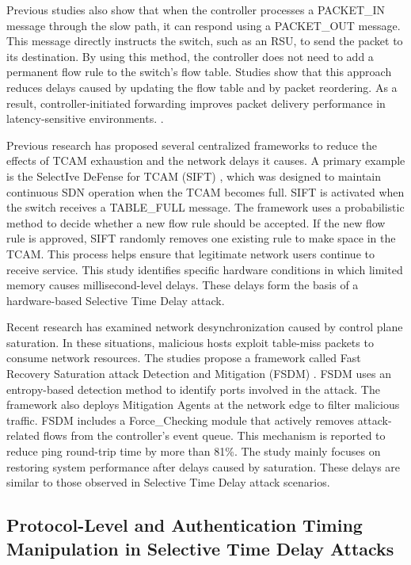 \documentclass[12pt, a4paper]{report}
\begin{document}
Previous studies also show that when the controller processes a PACKET\_IN message through the slow path, it can respond using a PACKET\_OUT message. This message directly instructs the switch, such as an RSU, to send the packet to its destination. By using this method, the controller does not need to add a permanent flow rule to the switch's flow table. Studies show that this approach reduces delays caused by updating the flow table and by packet reordering. As a result, controller-initiated forwarding improves packet delivery performance in latency-sensitive environments. \cite{PASCOAL2020107223} \cite{7929710}.

Previous research has proposed several centralized frameworks to reduce the effects of TCAM exhaustion and the network delays it causes. A primary example is the SelectIve DeFense for TCAM (SIFT) \cite{pascoal2017slow}, which was designed to maintain continuous SDN operation when the TCAM becomes full. SIFT is activated when the switch receives a TABLE\_FULL message. The framework uses a probabilistic method to decide whether a new flow rule should be accepted. If the new flow rule is approved, SIFT randomly removes one existing rule to make space in the TCAM. This process helps ensure that legitimate network users continue to receive service. This study identifies specific hardware conditions in which limited memory causes millisecond-level delays. These delays form the basis of a hardware-based Selective Time Delay attack.

Recent research has examined network desynchronization caused by control plane saturation. In these situations, malicious hosts exploit table-miss packets to consume network resources. The studies propose a framework called Fast Recovery Saturation attack Detection and Mitigation (FSDM) \cite{9356082}. FSDM uses an entropy-based detection method to identify ports involved in the attack. The framework also deploys Mitigation Agents at the network edge to filter malicious traffic. FSDM includes a Force\_Checking module that actively removes attack-related flows from the controller's event queue. This mechanism is reported to reduce ping round-trip time by more than 81\%. The study mainly focuses on restoring system performance after delays caused by saturation. These delays are similar to those observed in Selective Time Delay attack scenarios.

\subsection{Protocol-Level and Authentication Timing Manipulation in Selective Time Delay Attacks}
\end{document}
